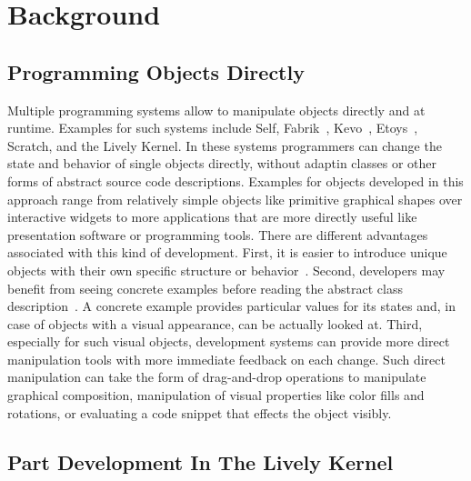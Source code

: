 \chapter{Background} \label{sec:BACKGROUND}



\section{Programming Objects Directly}

Multiple programming systems allow to manipulate objects directly and at runtime.
Examples for such systems include Self, Fabrik~\cite{Ingalls1988FVP}, Kevo~\cite{Tailvalsaari1992Kevo}, Etoys~\cite{Kay2005Etoys}, Scratch\cite{Maloney2010SPL}, and the Lively Kernel.
In these systems programmers can change the state and behavior of single objects directly, without adaptin classes or other forms of abstract source code descriptions. 
Examples for objects developed in this approach range from relatively simple objects like primitive graphical shapes over interactive widgets to more applications that are more directly useful like presentation software or programming tools.
There are different advantages associated with this kind of development.
First, it is easier to introduce unique objects with their own specific structure or behavior~. 
Second, developers may benefit from seeing concrete examples before reading the abstract class description~.
A concrete example provides particular values for its states and, in case of objects with a visual appearance, can be actually looked at.
Third, especially for such visual objects, development systems can provide more direct manipulation tools with more immediate feedback on each change.
Such direct manipulation can take the form of drag-and-drop operations to manipulate graphical composition, manipulation of visual properties like color fills and rotations, or evaluating a code snippet that effects the object visibly.



\section{Part Development In The Lively Kernel}

